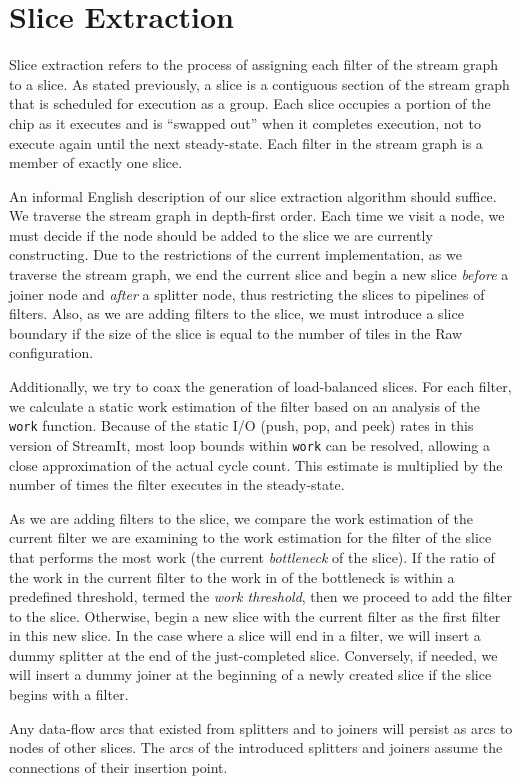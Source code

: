 \section{Slice Extraction}
\label{sec:extract}
Slice extraction refers to the process of assigning each filter of the
stream graph to a slice.  As stated previously, a slice is a
contiguous section of the stream graph that is scheduled for execution
as a group. Each slice occupies a portion of the chip as it executes
and is ``swapped out'' when it completes execution, not to execute
again until the next steady-state.  Each filter in the stream graph is
a member of exactly one slice.

An informal English description of our slice extraction algorithm
should suffice.  We traverse the stream graph in depth-first order.
Each time we visit a node, we must decide if the node should be added
to the slice we are currently constructing.  Due to the restrictions
of the current implementation, as we traverse the stream graph, we end
the current slice and begin a new slice {\it before} a joiner node and
{\it after} a splitter node, thus restricting the slices to pipelines
of filters.  Also, as we are adding filters to the slice, we must
introduce a slice boundary if the size of the slice is equal to the
number of tiles in the Raw configuration. 

Additionally, we try to coax the generation of load-balanced slices.
For each filter, we calculate a static work estimation of the filter
based on an analysis of the {\tt work} function.  Because of the
static I/O (push, pop, and peek) rates in this version of StreamIt,
most loop bounds within {\tt work} can be resolved, allowing a close
approximation of the actual cycle count.  This estimate is multiplied
by the number of times the filter executes in the steady-state.

As we are adding filters to the slice, we compare the work estimation
of the current filter we are examining to the work estimation for the
filter of the slice that performs the most work (the current {\it
bottleneck} of the slice).  If the ratio of the work in the current
filter to the work in of the bottleneck is within a predefined
threshold, termed the {\it work threshold}, then we proceed to add the
filter to the slice.  Otherwise, begin a new slice with the current
filter as the first filter in this new slice. In the case where a
slice will end in a filter, we will insert a dummy splitter at the end
of the just-completed slice.  Conversely, if needed, we will insert a
dummy joiner at the beginning of a newly created slice if the slice
begins with a filter.

Any data-flow arcs that existed from splitters and to joiners will
persist as arcs to nodes of other slices.  The arcs of the introduced
splitters and joiners assume the connections of their insertion point.

